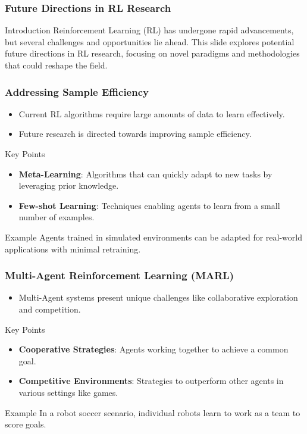 \documentclass{beamer}
\begin{document}
\begin{frame}[fragile]
    \frametitle{Future Directions in RL Research}
    \begin{block}{Introduction}
        Reinforcement Learning (RL) has undergone rapid advancements, but several challenges and opportunities lie ahead. This slide explores potential future directions in RL research, focusing on novel paradigms and methodologies that could reshape the field.
    \end{block}
\end{frame}

\begin{frame}[fragile]
    \frametitle{Addressing Sample Efficiency}
    \begin{itemize}
        \item Current RL algorithms require large amounts of data to learn effectively.
        \item Future research is directed towards improving sample efficiency.
    \end{itemize}
    \begin{block}{Key Points}
        \begin{itemize}
            \item \textbf{Meta-Learning}: Algorithms that can quickly adapt to new tasks by leveraging prior knowledge.
            \item \textbf{Few-shot Learning}: Techniques enabling agents to learn from a small number of examples.
        \end{itemize}
    \end{block}
    \begin{block}{Example}
        Agents trained in simulated environments can be adapted for real-world applications with minimal retraining.
    \end{block}
\end{frame}

\begin{frame}[fragile]
    \frametitle{Multi-Agent Reinforcement Learning (MARL)}
    \begin{itemize}
        \item Multi-Agent systems present unique challenges like collaborative exploration and competition.
    \end{itemize}
    \begin{block}{Key Points}
        \begin{itemize}
            \item \textbf{Cooperative Strategies}: Agents working together to achieve a common goal.
            \item \textbf{Competitive Environments}: Strategies to outperform other agents in various settings like games.
        \end{itemize}
    \end{block}
    \begin{block}{Example}
        In a robot soccer scenario, individual robots learn to work as a team to score goals.
    \end{block}
\end{frame}
\end{document}
